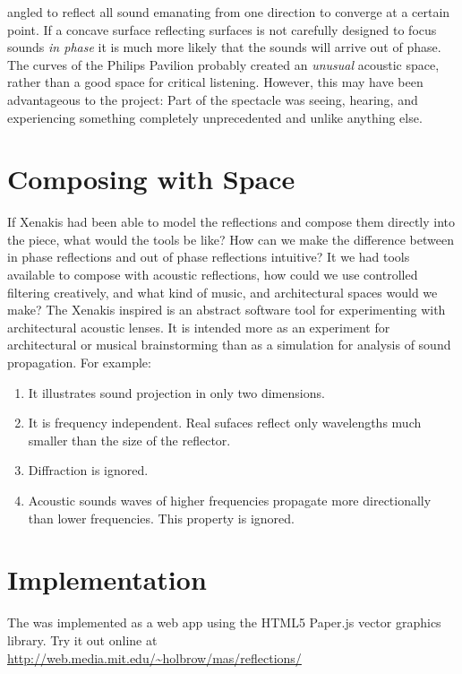 angled to reflect all sound emanating from one direction to converge
at a certain point. If a concave surface reflecting surfaces is not
carefully designed to focus sounds \textit{in phase} it is much more
likely that the sounds will arrive out of phase. The curves of the
Philips Pavilion probably created an \emph{unusual} acoustic space,
rather than a good space for critical listening. However, this may
have been advantageous to the project: Part of the spectacle was
seeing, hearing, and experiencing something completely unprecedented
and unlike anything else.

\section{Composing with Space}
\label{sec:composing-with-space}
If Xenakis had been able to model the reflections and compose them
directly into the piece, what would the tools be like? How can we make
the difference between in phase reflections and out of phase
reflections intuitive?  It we had tools available to compose with
acoustic reflections, how could we use controlled filtering
creatively, and what kind of music, and architectural spaces would we
make? The Xenakis inspired  is an abstract software tool for
experimenting with architectural acoustic lenses. It is intended more
as an experiment for architectural or musical brainstorming than as a
simulation for analysis of sound propagation. For example:
\begin{enumerate}
\item It illustrates sound projection in only two dimensions.
\item It is frequency independent. Real sufaces reflect only
  wavelengths much smaller than the size of the
  reflector.\cite{Zhixin2005} 
\item Diffraction is ignored. 
\item Acoustic sounds waves of higher frequencies propagate more
  directionally than lower frequencies. This property is ignored.
\end{enumerate}

\section{Implementation}
\label{sec:refmod-implementation}
The  was implemented as a web app using the HTML5
Paper.js vector graphics
library. Try it out online at\\
\noindent \url{http://web.media.mit.edu/~holbrow/mas/reflections/}

